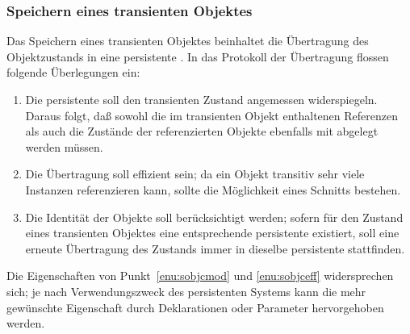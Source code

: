 \subsubsection{Speichern eines transienten Objektes}
%
Das Speichern eines transienten Objektes beinhaltet die \"{U}bertragung
des Objektzustands in eine persistente \representation. In das
Protokoll der \"{U}bertragung flossen folgende \"{U}berlegungen ein:
\begin{enumerate}
%
\item\label{enu:sobjcmod} Die persistente \representation{} soll den
transienten Zustand angemessen widerspiegeln. Daraus folgt, da\ss{}
sowohl die im transienten Objekt enthaltenen Referenzen als auch die
Zust\"{a}nde der referenzierten Objekte ebenfalls mit abgelegt werden
m\"{u}ssen.
%
\item\label{enu:sobjceff} Die \"{U}bertragung soll effizient sein; da
ein Objekt transitiv sehr viele Instanzen referenzieren kann, sollte
die M\"{o}glichkeit eines Schnitts bestehen. 
%
\item\label{enu:sobjcid} Die Identit\"{a}t der Objekte soll
ber\"{u}cksichtigt werden; sofern f\"{u}r den Zustand eines transienten
Objektes eine entsprechende persistente \representation{} existiert,
soll eine erneute \"{U}bertragung des Zustands immer in dieselbe
persistente \representation{} stattfinden.
%
\end{enumerate}
%
Die Eigenschaften von Punkt~\ref{enu:sobjcmod} und \ref{enu:sobjceff}
widersprechen sich; je nach Verwendungszweck des persistenten Systems
kann die mehr gew\"{u}nschte Eigenschaft durch Deklarationen oder
Parameter hervorgehoben werden.
%
